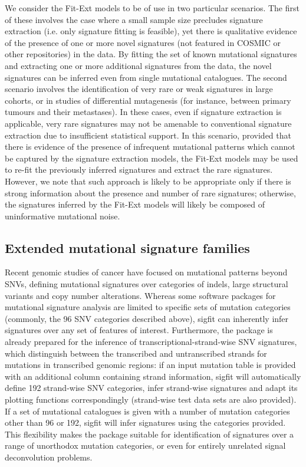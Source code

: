 We consider the Fit-Ext models to be of use in two particular scenarios. The first of these involves the case where a small sample size precludes signature extraction (i.e. only signature fitting is feasible), yet there is qualitative evidence of the presence of one or more novel signatures (not featured in COSMIC or other repositories) in the data. By fitting the set of known mutational signatures and extracting one or more additional signatures from the data, the novel signatures can be inferred even from single mutational catalogues. The second scenario involves the identification of very rare or weak signatures in large cohorts, or in studies of differential mutagenesis (for instance, between primary tumours and their metastases). In these cases, even if signature extraction is applicable, very rare signatures may not be amenable to conventional signature extraction due to insufficient statistical support. In this scenario, provided that there is evidence of the presence of infrequent mutational patterns which cannot be captured by the signature extraction models, the Fit-Ext models may be used to re-fit the previously inferred signatures and extract the rare signatures. However, we note that such approach is likely to be appropriate only if there is strong information about the presence and number of rare signatures; otherwise, the signatures inferred by the Fit-Ext models will likely be composed of uninformative mutational noise.

\subsection*{Extended mutational signature families}
Recent genomic studies of cancer \cite{Nik-Zainal2016, Waszak2017, Li2017, Zou2018, Macintyre2017} have focused on mutational patterns beyond SNVs, defining mutational signatures over categories of indels, large structural variants and copy number alterations. Whereas some software packages for mutational signature analysis are limited to specific sets of mutation categories (commonly, the 96 SNV categories described above), sigfit can inherently infer signatures over any set of features of interest. Furthermore, the package is already prepared for the inference of transcriptional-strand-wise SNV signatures, which distinguish between the transcribed and untranscribed strands for mutations in transcribed genomic regions: if an input mutation table is provided with an additional column containing strand information, sigfit will automatically define 192 strand-wise SNV categories, infer strand-wise signatures and adapt its plotting functions correspondingly (strand-wise test data sets are also provided). If a set of mutational catalogues is given with a number of mutation categories other than 96 or 192, sigfit will infer signatures using the categories provided. This flexibility makes the package suitable for identification of signatures over a range of unorthodox mutation categories, or even for entirely unrelated signal deconvolution problems.